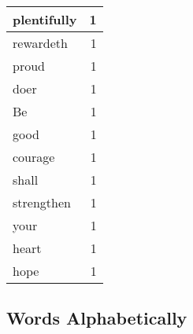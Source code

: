 \begin{center}
\begin{longtable}{l|r}
plentifully & 1 \\ \hline
rewardeth & 1 \\ \hline
proud & 1 \\ \hline
doer & 1 \\ \hline
Be & 1 \\ \hline
good & 1 \\ \hline
courage & 1 \\ \hline
shall & 1 \\ \hline
strengthen & 1 \\ \hline
your & 1 \\ \hline
heart & 1 \\ \hline
hope & 1 \\ \hline
\end{longtable}
\end{center}



\normalsize



\subsection{Words Alphabetically}

